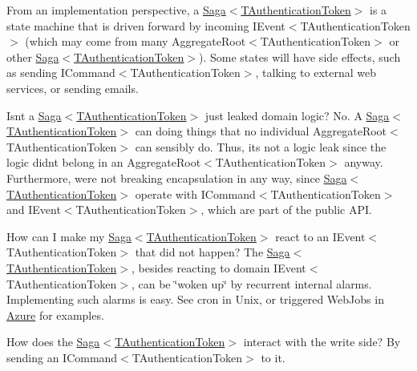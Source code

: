 From an implementation perspective, a \hyperlink{classCqrs_1_1Domain_1_1Saga_a1b6019cecbbf2572b64dd456cb5d91a2_a1b6019cecbbf2572b64dd456cb5d91a2}{Saga$<$\+T\+Authentication\+Token$>$} is a state machine that is driven forward by incoming I\+Event$<$\+T\+Authentication\+Token$>$ (which may come from many Aggregate\+Root$<$\+T\+Authentication\+Token$>$ or other \hyperlink{classCqrs_1_1Domain_1_1Saga_a1b6019cecbbf2572b64dd456cb5d91a2_a1b6019cecbbf2572b64dd456cb5d91a2}{Saga$<$\+T\+Authentication\+Token$>$}). Some states will have side effects, such as sending I\+Command$<$\+T\+Authentication\+Token$>$, talking to external web services, or sending emails. 

Isn\textquotesingle{}t a \hyperlink{classCqrs_1_1Domain_1_1Saga_a1b6019cecbbf2572b64dd456cb5d91a2_a1b6019cecbbf2572b64dd456cb5d91a2}{Saga$<$\+T\+Authentication\+Token$>$} just leaked domain logic? No. A \hyperlink{classCqrs_1_1Domain_1_1Saga_a1b6019cecbbf2572b64dd456cb5d91a2_a1b6019cecbbf2572b64dd456cb5d91a2}{Saga$<$\+T\+Authentication\+Token$>$} can doing things that no individual Aggregate\+Root$<$\+T\+Authentication\+Token$>$ can sensibly do. Thus, it\textquotesingle{}s not a logic leak since the logic didn\textquotesingle{}t belong in an Aggregate\+Root$<$\+T\+Authentication\+Token$>$ anyway. Furthermore, we\textquotesingle{}re not breaking encapsulation in any way, since \hyperlink{classCqrs_1_1Domain_1_1Saga_a1b6019cecbbf2572b64dd456cb5d91a2_a1b6019cecbbf2572b64dd456cb5d91a2}{Saga$<$\+T\+Authentication\+Token$>$} operate with I\+Command$<$\+T\+Authentication\+Token$>$ and I\+Event$<$\+T\+Authentication\+Token$>$, which are part of the public A\+PI.

How can I make my \hyperlink{classCqrs_1_1Domain_1_1Saga_a1b6019cecbbf2572b64dd456cb5d91a2_a1b6019cecbbf2572b64dd456cb5d91a2}{Saga$<$\+T\+Authentication\+Token$>$} react to an I\+Event$<$\+T\+Authentication\+Token$>$ that did not happen? The \hyperlink{classCqrs_1_1Domain_1_1Saga_a1b6019cecbbf2572b64dd456cb5d91a2_a1b6019cecbbf2572b64dd456cb5d91a2}{Saga$<$\+T\+Authentication\+Token$>$}, besides reacting to domain I\+Event$<$\+T\+Authentication\+Token$>$, can be \char`\"{}woken up\char`\"{} by recurrent internal alarms. Implementing such alarms is easy. See cron in Unix, or triggered Web\+Jobs in \hyperlink{namespaceCqrs_1_1Azure}{Azure} for examples.

How does the \hyperlink{classCqrs_1_1Domain_1_1Saga_a1b6019cecbbf2572b64dd456cb5d91a2_a1b6019cecbbf2572b64dd456cb5d91a2}{Saga$<$\+T\+Authentication\+Token$>$} interact with the write side? By sending an I\+Command$<$\+T\+Authentication\+Token$>$ to it. 

